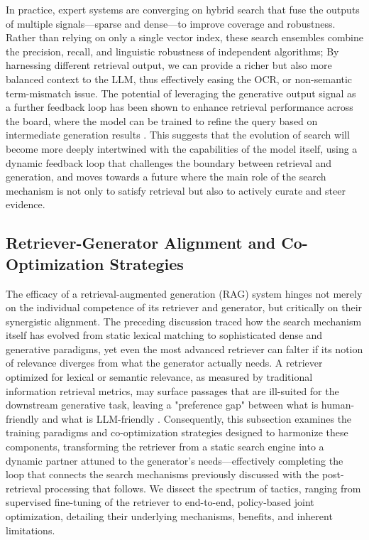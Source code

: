 \documentclass[11pt,a4paper]{article}
\begin{document}
In practice, expert systems are converging on hybrid search that fuse the outputs of multiple signals---sparse and dense---to improve coverage and robustness. Rather than relying on only a single vector index, these search ensembles combine the precision, recall, and linguistic robustness of independent algorithms; By harnessing different retrieval output, we can provide a richer but also more balanced context to the LLM, thus effectively easing the OCR, or non-semantic term-mismatch issue. The potential of leveraging the generative output signal as a further feedback loop has been shown to enhance retrieval performance across the board, where the model can be trained to refine the query based on intermediate generation results \cite{arxiv:2305.15294v2}. This suggests that the evolution of search will become more deeply intertwined with the capabilities of the model itself, using a dynamic feedback loop that challenges the boundary between retrieval and generation, and moves towards a future where the main role of the search mechanism is not only to satisfy retrieval but also to actively curate and steer evidence.


\subsection{Retriever-Generator Alignment and Co-Optimization Strategies}


The efficacy of a retrieval-augmented generation (RAG) system hinges not merely on the individual competence of its retriever and generator, but critically on their synergistic alignment. The preceding discussion traced how the search mechanism itself has evolved from static lexical matching to sophisticated dense and generative paradigms, yet even the most advanced retriever can falter if its notion of relevance diverges from what the generator actually needs. A retriever optimized for lexical or semantic relevance, as measured by traditional information retrieval metrics, may surface passages that are ill-suited for the downstream generative task, leaving a "preference gap" between what is human-friendly and what is LLM-friendly \cite{arxiv:2401.06954v2}. Consequently, this subsection examines the training paradigms and co-optimization strategies designed to harmonize these components, transforming the retriever from a static search engine into a dynamic partner attuned to the generator's needs---effectively completing the loop that connects the search mechanisms previously discussed with the post-retrieval processing that follows. We dissect the spectrum of tactics, ranging from supervised fine-tuning of the retriever to end-to-end, policy-based joint optimization, detailing their underlying mechanisms, benefits, and inherent limitations.
\end{document}
